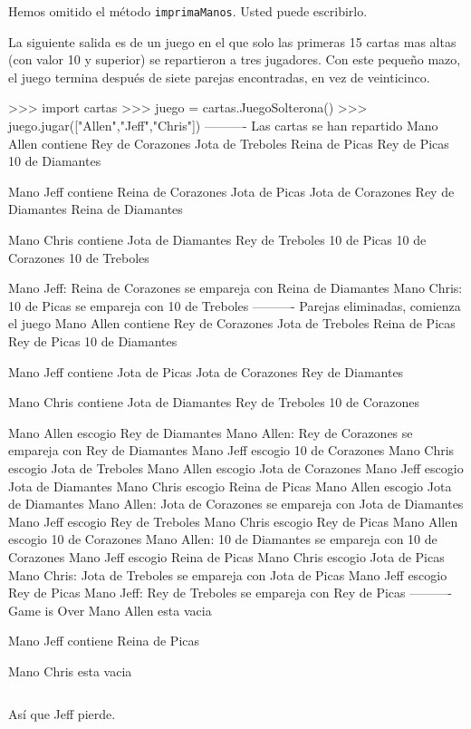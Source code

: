 Hemos omitido el método \texttt{imprimaManos}. Usted puede escribirlo.

La siguiente salida es de un juego en el que solo las primeras 15
cartas mas altas (con valor 10 y superior) se repartieron a tres jugadores.
Con este pequeño mazo, el juego termina después de siete parejas encontradas,
en vez de veinticinco.
\begin{pyconcode}
>>> import cartas
>>> juego = cartas.JuegoSolterona()
>>> juego.jugar(["Allen","Jeff","Chris"])
---------- Las cartas se han repartido
Mano Allen contiene
Rey de Corazones
 Jota de Treboles
  Reina de Picas
   Rey de Picas
    10 de Diamantes

Mano Jeff contiene
Reina de Corazones
 Jota de Picas
  Jota de Corazones
   Rey de Diamantes
    Reina de Diamantes

Mano Chris contiene
Jota de Diamantes
 Rey de Treboles
  10 de Picas
   10 de Corazones
    10 de Treboles

Mano Jeff: Reina de Corazones se empareja con Reina de 
Diamantes
Mano Chris: 10 de Picas se empareja con 10 de Treboles
----------  Parejas eliminadas, comienza el juego
Mano Allen contiene
Rey de Corazones
 Jota de Treboles
  Reina de Picas
   Rey de Picas
    10 de Diamantes

Mano Jeff contiene
Jota de Picas
 Jota de Corazones
  Rey de Diamantes

Mano Chris contiene
Jota de Diamantes
 Rey de Treboles
  10 de Corazones

Mano Allen escogio Rey de Diamantes
Mano Allen: Rey de Corazones se empareja con Rey de 
Diamantes
Mano Jeff escogio 10 de Corazones
Mano Chris escogio Jota de Treboles
Mano Allen escogio Jota de Corazones
Mano Jeff escogio Jota de Diamantes
Mano Chris escogio Reina de Picas
Mano Allen escogio Jota de Diamantes
Mano Allen: Jota de Corazones se empareja con Jota de 
Diamantes
Mano Jeff escogio Rey de Treboles
Mano Chris escogio Rey de Picas
Mano Allen escogio 10 de Corazones
Mano Allen: 10 de Diamantes se empareja con 10 de Corazones
Mano Jeff escogio Reina de Picas
Mano Chris escogio Jota de Picas
Mano Chris: Jota de Treboles se empareja con Jota de Picas
Mano Jeff escogio Rey de Picas
Mano Jeff: Rey de Treboles se empareja con Rey de Picas
---------- Game is Over
Mano Allen esta vacia

Mano Jeff contiene
Reina de Picas

Mano Chris esta vacia
\end{pyconcode}
\begin{verbatim}

\end{verbatim}
Así que Jeff pierde.

